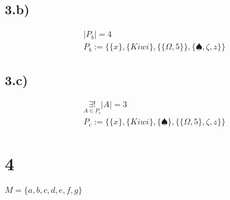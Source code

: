 \documentclass[10pt,ngerman]{scrartcl}
\begin{document}
\subsection{3.b)}
\begin{align*}
 |P_b| = 4\\
 P_b := \{\{x\},\{Kiwi\},\{\{\Omega, 5\}\},\{\spadesuit,\zeta,z\}\}
\end{align*}
\subsection{3.c)}
\begin{align*}
 \underset{A \in P_c}{\exists!}|A| = 3\\
 P_c := \{\{x\},\{Kiwi\},\{\spadesuit\},\{\{\Omega, 5\},\zeta, z\}\}
\end{align*}
\section{4}
$M = \{a, b, c, d, e, f , g\}$
\end{document}

